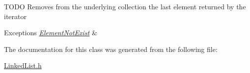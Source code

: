 T\-O\-D\-O Removes from the underlying collection the last element returned by the iterator 
\begin{DoxyExceptions}{Exceptions}
{\em \hyperlink{class_element_not_exist}{Element\-Not\-Exist}} & \\
\hline
\end{DoxyExceptions}


The documentation for this class was generated from the following file\-:\begin{DoxyCompactItemize}
\item 
\hyperlink{_linked_list_8h}{Linked\-List.\-h}\end{DoxyCompactItemize}
